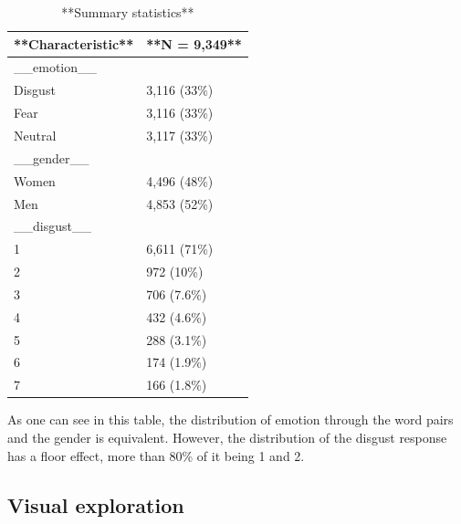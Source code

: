 \documentclass[
]{article}
\begin{document}
\begin{table}

\caption{\label{tab:unnamed-chunk-3}**Summary statistics**}
\centering
\begin{tabular}[t]{l|l}
\hline
**Characteristic** & **N = 9,349**\\
\hline
\_\_emotion\_\_ & \\
\hline
Disgust & 3,116 (33\%)\\
\hline
Fear & 3,116 (33\%)\\
\hline
Neutral & 3,117 (33\%)\\
\hline
\_\_gender\_\_ & \\
\hline
Women & 4,496 (48\%)\\
\hline
Men & 4,853 (52\%)\\
\hline
\_\_disgust\_\_ & \\
\hline
1 & 6,611 (71\%)\\
\hline
2 & 972 (10\%)\\
\hline
3 & 706 (7.6\%)\\
\hline
4 & 432 (4.6\%)\\
\hline
5 & 288 (3.1\%)\\
\hline
6 & 174 (1.9\%)\\
\hline
7 & 166 (1.8\%)\\
\hline
\end{tabular}
\end{table}

As one can see in this table, the distribution of emotion through the
word pairs and the gender is equivalent. However, the distribution of
the disgust response has a floor effect, more than 80\% of it being 1
and 2.

\hypertarget{visual-exploration}{%
\subsection{Visual exploration}\label{visual-exploration}}
\end{document}
